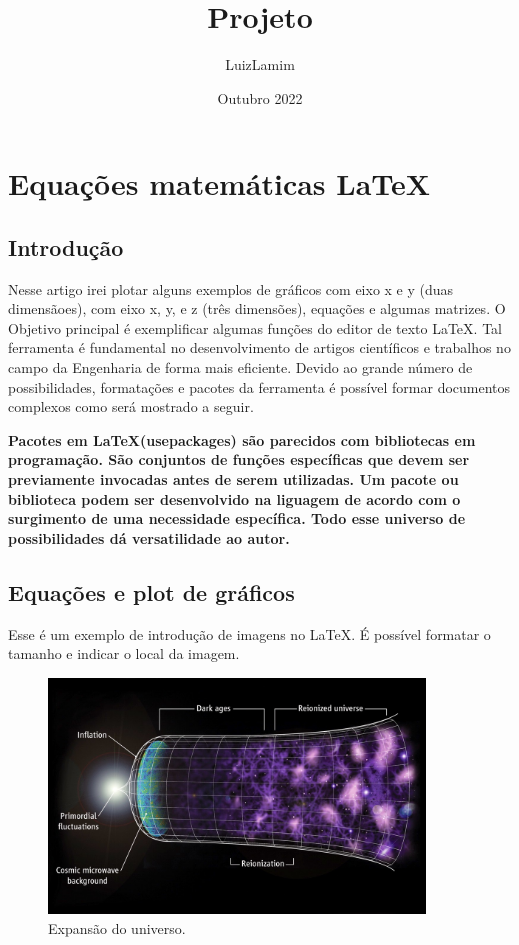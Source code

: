 \documentclass[a4paper,12pt]{article}
\title{Projeto}
\author{LuizLamim}
\date{Outubro 2022}
\begin{document}
\maketitle

\section{Equações matemáticas \LaTeX}
\subsection{Introdução}
    Nesse artigo irei plotar alguns exemplos de gráficos com eixo x e y (duas dimensãoes), com eixo
x, y, e z (três dimensões), equações e algumas matrizes. O Objetivo principal é exemplificar algumas
funções do editor de texto \LaTeX. Tal ferramenta é fundamental no desenvolvimento de 
artigos científicos e trabalhos no campo da Engenharia de forma mais eficiente. Devido ao grande
número de possibilidades, formatações e pacotes da ferramenta é possível formar documentos complexos como será
mostrado a seguir. 

\begin{center}
\textbf{   Pacotes em \LaTeX (usepackages) são parecidos com bibliotecas em programação. 
    São conjuntos de funções específicas que devem ser previamente invocadas antes de serem utilizadas. 
    Um pacote ou biblioteca podem ser desenvolvido na liguagem de acordo com o surgimento de uma necessidade
    específica. Todo esse universo de possibilidades dá versatilidade ao autor. }
\end{center}

\subsection{Equações e plot de gráficos}

Esse é um exemplo de introdução de imagens no \LaTeX. É possível formatar o tamanho e indicar o local 
da imagem.

\begin{figure}[ht]
\centering
\includegraphics[width=10cm]{figuras/bigbang.jpeg}
\caption{Expansão do universo.}
\label{fig01}
\end{figure}
\end{document}
